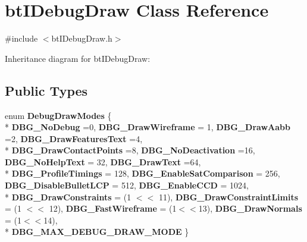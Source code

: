 \hypertarget{classbt_i_debug_draw}{\section{bt\+I\+Debug\+Draw Class Reference}
\label{classbt_i_debug_draw}
}


{\ttfamily \#include $<$bt\+I\+Debug\+Draw.\+h$>$}



Inheritance diagram for bt\+I\+Debug\+Draw\+:
\subsection*{Public Types}
\begin{DoxyCompactItemize}
\item 
\hypertarget{classbt_i_debug_draw_ab4bb43fbfefb526c552c0943fac5832a}{enum {\bfseries Debug\+Draw\+Modes} \{ \\*
{\bfseries D\+B\+G\+\_\+\+No\+Debug} =0, 
{\bfseries D\+B\+G\+\_\+\+Draw\+Wireframe} = 1, 
{\bfseries D\+B\+G\+\_\+\+Draw\+Aabb} =2, 
{\bfseries D\+B\+G\+\_\+\+Draw\+Features\+Text} =4, 
\\*
{\bfseries D\+B\+G\+\_\+\+Draw\+Contact\+Points} =8, 
{\bfseries D\+B\+G\+\_\+\+No\+Deactivation} =16, 
{\bfseries D\+B\+G\+\_\+\+No\+Help\+Text} = 32, 
{\bfseries D\+B\+G\+\_\+\+Draw\+Text} =64, 
\\*
{\bfseries D\+B\+G\+\_\+\+Profile\+Timings} = 128, 
{\bfseries D\+B\+G\+\_\+\+Enable\+Sat\+Comparison} = 256, 
{\bfseries D\+B\+G\+\_\+\+Disable\+Bullet\+L\+C\+P} = 512, 
{\bfseries D\+B\+G\+\_\+\+Enable\+C\+C\+D} = 1024, 
\\*
{\bfseries D\+B\+G\+\_\+\+Draw\+Constraints} = (1 $<$$<$ 11), 
{\bfseries D\+B\+G\+\_\+\+Draw\+Constraint\+Limits} = (1 $<$$<$ 12), 
{\bfseries D\+B\+G\+\_\+\+Fast\+Wireframe} = (1$<$$<$13), 
{\bfseries D\+B\+G\+\_\+\+Draw\+Normals} = (1$<$$<$14), 
\\*
{\bfseries D\+B\+G\+\_\+\+M\+A\+X\+\_\+\+D\+E\+B\+U\+G\+\_\+\+D\+R\+A\+W\+\_\+\+M\+O\+D\+E}
 \}}\label{classbt_i_debug_draw_ab4bb43fbfefb526c552c0943fac5832a}

\end{DoxyCompactItemize}
